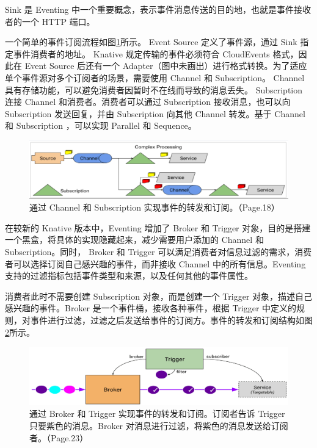 \documentclass[11pt]{article}
\begin{document}
Sink 是 Eventing 中一个重要概念，表示事件消息传送的目的地，也就是事件接收者的一个 HTTP 端口。


一个简单的事件订阅流程如图\ref{knative-cha_sub}所示。 Event Source 定义了事件源，通过 Sink 指定事件消费者的地址。 Knative 规定传输的事件必须符合 CloudEvents 格式，因此在 Event Source 后还有一个 Adapter（图中未画出）进行格式转换。为了适应单个事件源对多个订阅者的场景，需要使用 Channel 和 Subscription。 Channel 具有存储功能，可以避免消费者因暂时不在线而导致的消息丢失。 Subscription 连接 Channel 和消费者。消费者可以通过 Subscription 接收消息，也可以向 Subscription 发送回复，并由 Subscription 向其他 Channel 转发。基于 Channel 和 Subscription ，可以实现 Parallel 和 Sequence。

\begin{figure}[!htbp]
	\centering
	\includegraphics[width=1.0\textwidth]{figs/knative-cha_sub.png}
	\caption{通过 Channel 和 Subscription 实现事件的转发和订阅。（\cite{knative-eventing}Page.18）}
	\label{knative-cha_sub}
\end{figure}


在较新的 Knative 版本中，Eventing 增加了 Broker 和 Trigger 对象，目的是搭建一个黑盒，将具体的实现隐藏起来，减少需要用户添加的 Channel 和 Subscription。同时， Broker 和 Trigger 可以满足消费者对信息过滤的需求，消费者可以选择订阅自己感兴趣的事件，而非接收 Channel 中的所有信息。Eventing 支持的过滤指标包括事件类型和来源，以及任何其他的事件属性。


消费者此时不需要创建 Subscription 对象，而是创建一个 Trigger 对象，描述自己感兴趣的事件。Broker 是一个事件桶，接收各种事件，根据 Trigger 中定义的规则，对事件进行过滤，过滤之后发送给事件的订阅方。事件的转发和订阅结构如图\ref{knative-broker}所示。

\begin{figure}[!htbp]
	\centering
	\includegraphics[width=1.0\textwidth]{figs/knative-broker_2.png}
	\caption{通过 Broker 和 Trigger 实现事件的转发和订阅。订阅者告诉 Trigger 只要紫色的消息。Broker 对消息进行过滤，将紫色的消息发送给订阅者。（\cite{knative-eventing}Page.23）}
	\label{knative-broker}
\end{figure}
\end{document}
